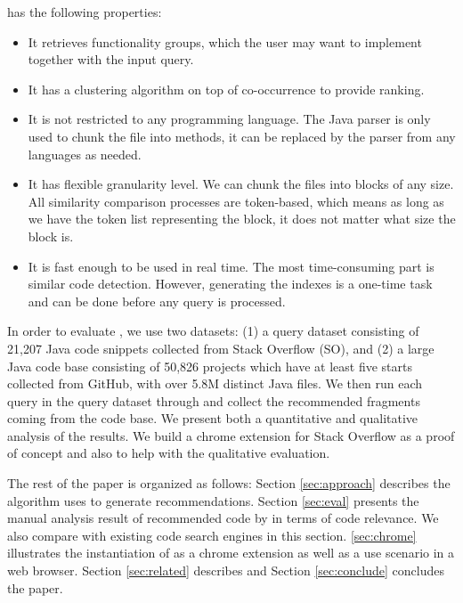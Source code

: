 {\tool} has the following properties:
\begin{itemize}
	\item It retrieves functionality groups, which the user may want to implement together with the input query.
	\item It has a clustering algorithm on top of co-occurrence to provide ranking.
	\item It is not restricted to any programming language. The Java parser is only used to chunk the file into methods, it can be replaced by the parser from any languages as needed.
	\item It has flexible granularity level. We can chunk the files into blocks of any size. All similarity comparison processes are token-based, which means as long as we have the token list representing the block, it does not matter what size the block is.
	\item It is fast enough to be used in real time. The most
          time-consuming part is similar code detection. However,
          generating the indexes is a one-time task and can be done
          before any query is processed.	
\end{itemize}

In order to evaluate {\tool}, we use two datasets: (1) a query dataset
consisting of 21,207 Java code snippets collected from Stack Overflow
(SO), and (2) a large Java code base consisting of 50,826 projects which 
have at least five starts collected from GitHub, with over 5.8M distinct 
Java files. We then run each query in the query dataset through {\tool} 
and collect the recommended fragments coming from the code base. 
We present both a quantitative and qualitative analysis of the results.
We build a chrome extension for Stack Overflow as a proof of concept and also to help with the qualitative evaluation.

The rest of the paper is organized as follows: Section
\ref{sec:approach} describes the algorithm {\tool} uses to generate
recommendations. Section \ref{sec:eval} presents the manual analysis result of recommended code by {\tool} in terms of code relevance. We also compare {\tool} with existing code search engines in this section. \ref{sec:chrome} illustrates the instantiation of {\tool} as a chrome extension as well as a use scenario in a web browser. Section \ref{sec:related} describes and Section \ref{sec:conclude} concludes the paper.
